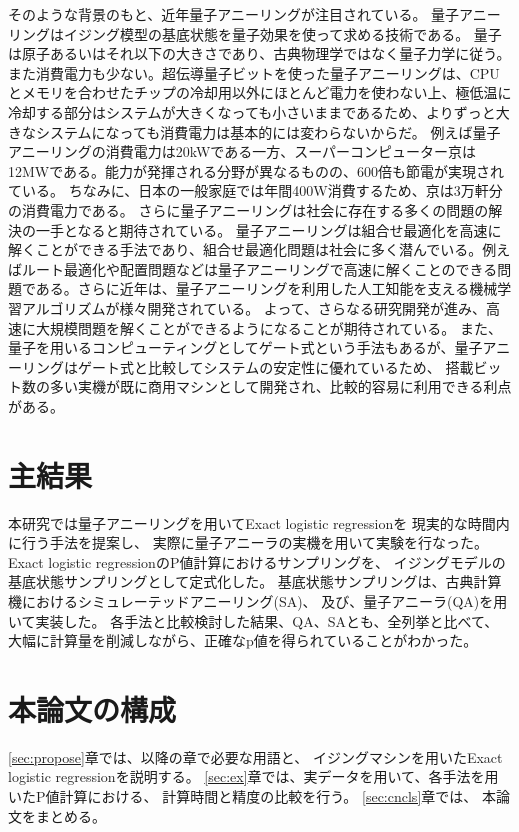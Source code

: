 \documentclass[12pt, dvipdfmx]{jmaster}
\theoremstyle{definition}
\begin{document}
そのような背景のもと、近年量子アニーリングが注目されている。
量子アニーリングはイジング模型の基底状態を量子効果を使って求める技術である。
量子は原子あるいはそれ以下の大きさであり、古典物理学ではなく量子力学に従う。
また消費電力も少ない。超伝導量子ビットを使った量子アニーリングは、CPUとメモリを合わせたチップの冷却用以外にほとんど電力を使わない上、極低温に冷却する部分はシステムが大きくなっても小さいままであるため、よりずっと大きなシステムになっても消費電力は基本的には変わらないからだ。
例えば量子アニーリングの消費電力は20kWである一方、スーパーコンピューター京は12MWである。能力が発揮される分野が異なるものの、600倍も節電が実現されている。
ちなみに、日本の一般家庭では年間400W消費するため、京は3万軒分の消費電力である。
さらに量子アニーリングは社会に存在する多くの問題の解決の一手となると期待されている。
量子アニーリングは組合せ最適化を高速に解くことができる手法であり、組合せ最適化問題は社会に多く潜んでいる。例えばルート最適化や配置問題などは量子アニーリングで高速に解くことのできる問題である。さらに近年は、量子アニーリングを利用した人工知能を支える機械学習アルゴリズムが様々開発されている。
よって、さらなる研究開発が進み、高速に大規模問題を解くことができるようになることが期待されている。
また、量子を用いるコンピューティングとしてゲート式という手法もあるが、量子アニーリングはゲート式と比較してシステムの安定性に優れているため、
搭載ビット数の多い実機が既に商用マシンとして開発され、比較的容易に利用できる利点がある\cite{nishimori}。


\section{主結果}
本研究では量子アニーリングを用いてExact logistic regressionを
現実的な時間内に行う手法を提案し、
実際に量子アニーラの実機を用いて実験を行なった。
Exact logistic regressionのP値計算におけるサンプリングを、
イジングモデルの基底状態サンプリングとして定式化した。
基底状態サンプリングは、古典計算機におけるシミュレーテッドアニーリング(SA)、
及び、量子アニーラ(QA)を用いて実装した。
各手法と比較検討した結果、QA、SAとも、全列挙と比べて、
大幅に計算量を削減しながら、正確なp値を得られていることがわかった。

\section{本論文の構成}
\ref{sec:propose}章では、以降の章で必要な用語と、
イジングマシンを用いたExact logistic regressionを説明する。 
\ref{sec:ex}章では、実データを用いて、各手法を用いたP値計算における、
計算時間と精度の比較を行う。
\ref{sec:cncls}章では、 本論文をまとめる。
\end{document}
